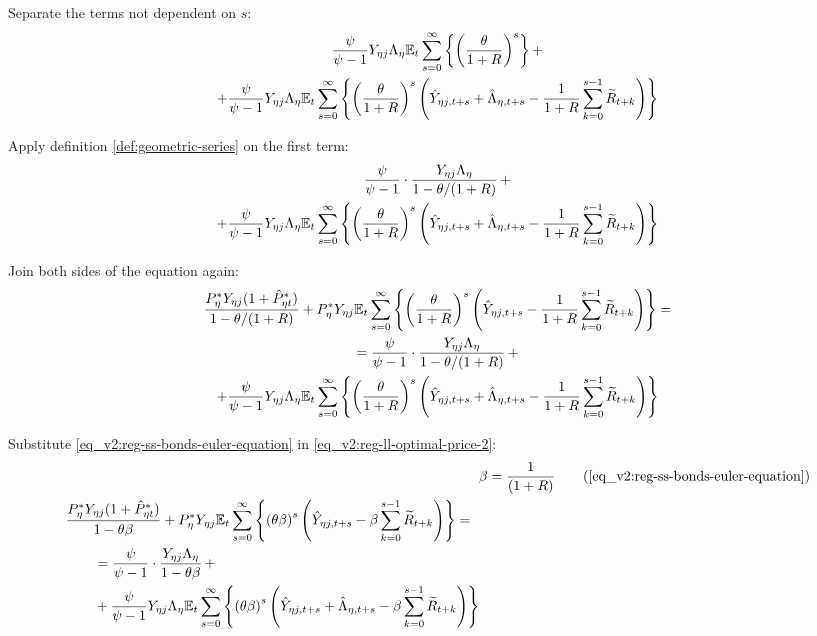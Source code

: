 \documentclass[../thesis.tex]{subfiles}
\begin{document}
Separate the terms not dependent on $s$:
\begin{multline}
	\frac{\psi}{\psi-1} Y_{\eta j} \Lambda_{\eta} {\mathbb{E}_{t}} \sum_{s=0}^{\infty} \left\{ \left( \frac{\theta}{1 + R} \right)^s \right\} + 
	\\
	+ \frac{\psi}{\psi-1} Y_{\eta j} \Lambda_{\eta} {\mathbb{E}_{t}} \sum_{s=0}^{\infty} \left\{ \left( \frac{\theta}{1 + R} \right)^s \left( \hat{Y}_{\eta j, t+s} + \hat{\Lambda}_{\eta, t+s} - \frac{1}{1 + R} \sum_{k=0}^{s-1} \widetilde{R}_{t+k} \right) \right\} \nonumber
\end{multline}

Apply definition \ref{def:geometric-series} on the first term:
\begin{multline}
	\frac{\psi}{\psi-1} \cdot \frac{Y_{\eta j} \Lambda_{\eta}}{1-\theta /(1+R)} \, + 
	\\
	+ \frac{\psi}{\psi-1} Y_{\eta j} \Lambda_{\eta} {\mathbb{E}_{t}} \sum_{s=0}^{\infty} \left\{ \left( \frac{\theta}{1 + R} \right)^s \left( \hat{Y}_{\eta j, t+s} + \hat{\Lambda}_{\eta, t+s} - \frac{1}{1 + R} \sum_{k=0}^{s-1} \widetilde{R}_{t+k} \right) \right\} \nonumber
\end{multline}

Join both sides of the equation again:
\begin{multline}
	\frac{ P_{\eta}^{\ast} Y_{\eta j} ( 1 + \hat{P}_{\eta t}^{\ast} )}{1-\theta /(1+R)} + P_{\eta}^{\ast} Y_{\eta j} {\mathbb{E}_{t}} \sum_{s=0}^{\infty} \left\{ \left( \frac{\theta}{1 + R} \right)^s \left( \hat{Y}_{\eta j, t+s} - \frac{1}{1 + R} \sum_{k=0}^{s-1} \widetilde{R}_{t+k} \right) \right\} = 
	\\
	= \frac{\psi}{\psi-1} \cdot \frac{Y_{\eta j} \Lambda_{\eta}}{1-\theta /(1+R)} \, + 
	\\
	+ \frac{\psi}{\psi-1} Y_{\eta j} \Lambda_{\eta} {\mathbb{E}_{t}} \sum_{s=0}^{\infty} \left\{ \left( \frac{\theta}{1 + R} \right)^s \left( \hat{Y}_{\eta j, t+s} + \hat{\Lambda}_{\eta, t+s} - \frac{1}{1 + R} \sum_{k=0}^{s-1} \widetilde{R}_{t+k} \right) \right\} \label{eq_v2:reg-ll-optimal-price-2}
\end{multline}

Substitute \ref{eq_v2:reg-ss-bonds-euler-equation} in \ref{eq_v2:reg-ll-optimal-price-2}:
\begin{align}
	& \beta = \frac{1}{(1 + R)} \tag{\ref{eq_v2:reg-ss-bonds-euler-equation}} \\
	\begin{split} & \frac{ P_{\eta}^{\ast} Y_{\eta j} ( 1 + \hat{P}_{\eta t}^{\ast} )}{1- \theta \beta} + P_{\eta}^{\ast} Y_{\eta j} \E \sum_{s=0}^{\infty} \left\{ \left( \theta \beta \right)^s \left( \hat{Y}_{\eta j, t+s} - \beta \sum_{k=0}^{s-1} \widetilde{R}_{t+k} \right) \right\} = \\ & \qquad = \frac{\psi}{\psi-1} \cdot \frac{Y_{\eta j} \Lambda_{\eta}}{1- \theta \beta} \, + \\ & \qquad + \frac{\psi}{\psi-1} Y_{\eta j} \Lambda_{\eta} \E \sum_{s=0}^{\infty} \left\{ \left( \theta \beta \right)^s \left( \hat{Y}_{\eta j, t+s} + \hat{\Lambda}_{\eta, t+s} - \beta \sum_{k=0}^{s-1} \widetilde{R}_{t+k} \right) \right\} \end{split} \label{eq_v2:reg-ll-optimal-price-3}
\end{align}
\end{document}
